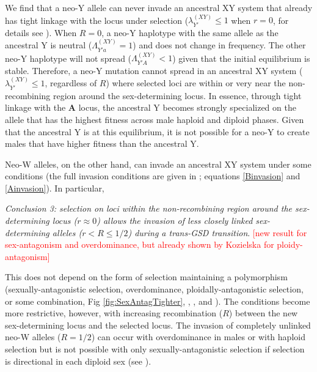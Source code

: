 \documentclass[10pt,letterpaper]{article}
\begin{document}
We find that a neo-Y allele can never invade an ancestral XY system that already has tight linkage with the locus under selection ($\lambda_{Y'}^{(XY)} \leq 1$ when $r=0$, for details see ). 
When $R=0$, a neo-Y haplotype with the same allele as the ancestral Y is neutral ($\Lambda_{Y'a}^{(XY)}=1$) and does not change in frequency.
The other neo-Y haplotype will not spread ($\Lambda_{Y'A}^{(XY)}<1$) given that the initial equilibrium is stable. 
Therefore, a neo-Y mutation cannot spread in an ancestral XY system ($\lambda_{Y'}^{(XY)} \leq 1$, regardless of $R$) where selected loci are within or very near the non-recombining region around the sex-determining locus.
In essence, through tight linkage with the $\mathbf{A}$ locus, the ancestral Y becomes strongly specialized on the allele that has the highest fitness across male haploid and diploid phases. 
Given that the ancestral Y is at this equilibrium, it is not possible for a neo-Y to create males that have higher fitness than the ancestral Y. 

Neo-W alleles, on the other hand, can invade an ancestral XY system under some conditions (the full invasion conditions are given in ; equations \ref{Binvasion} and \ref{Ainvasion}). 
In particular,
\vspace{0.5cm}

\noindent\textit{Conclusion 3: selection on loci within the non-recombining region around the sex-determining locus ($r\approx0$) allows the invasion of less closely linked sex-determining alleles ($r<R\leq1/2$) during a trans-GSD transition}.
\textcolor{red}{[new result for sex-antagonism and overdominance, but already shown by Kozielska for ploidy-antagonism]}
\vspace{0.5cm}

\noindent This does not depend on the form of selection maintaining a polymorphism (sexually-antagonistic selection, overdominance, ploidally-antagonistic selection, or some combination, Fig \ref{fig:SexAntagTighter}, , , and ).  
The conditions become more restrictive, however, with increasing recombination ($R$) between the new sex-determining locus and the selected locus.  
The invasion of completely unlinked neo-W alleles ($R = 1/2$) can occur with overdominance in males or with haploid selection but is not possible with only sexually-antagonistic selection if selection is directional in each diploid sex (see ).
\vspace{0.5cm}
\end{document}
